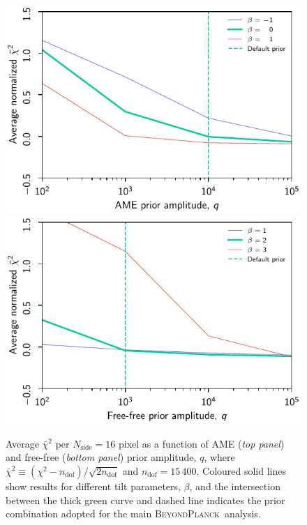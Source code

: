 \documentclass[twocolumn]{aa}
\newcommand{\BP}{\textsc{BeyondPlanck}}
\begin{document}
\begin{figure}
  \center	
  \includegraphics[width=\linewidth]{figs/chisq_ame_prior_v1.pdf}
  \includegraphics[width=\linewidth]{figs/chisq_ff_prior_v1.pdf}\\
  \caption{Average $\bar{\chi}^2$ per $N_{\mathrm{side}}=16$ pixel as a function of AME (\emph{top panel}) and free-free (\emph{bottom panel}) prior amplitude, $q$, where $\bar{\chi}^2\equiv (\chi^2-n_{\mathrm{dof}})/\sqrt{2n_\mathrm{dof}}$ and $n_{\mathrm{dof}}=15\,400$. Coloured solid lines show results for different tilt parameters, $\beta$, and the intersection between the thick green curve and dashed line indicates the prior combination adopted for the main \BP\ analysis.}
  \label{fig:chisq_prior}
\end{figure}
\end{document}
